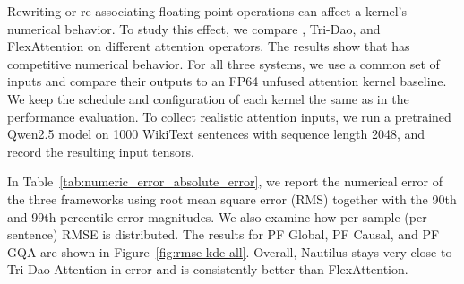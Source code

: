 \noindent
\begin{minipage}[t]{0.46\textwidth}
\vspace{0pt}
Rewriting or re-associating floating-point operations can affect a kernel's numerical
behavior. To study this effect, we compare \NAME{}, Tri-Dao, and FlexAttention on
different attention operators. The results show that \NAME{} has competitive numerical
behavior. For all three systems, we use a common set of inputs and compare their outputs
to an FP64 unfused attention kernel baseline.
We keep the schedule and configuration of each kernel the same as in the performance
evaluation. To collect realistic attention inputs, we run a pretrained Qwen2.5 model
on 1000 WikiText sentences with sequence length 2048, and record the resulting input tensors.

In Table~\ref{tab:numeric_error_absolute_error}, we report the numerical error of the
three frameworks using root mean square error (RMS) together with the 90th and 99th
percentile error magnitudes. We also examine how per-sample (per-sentence) RMSE is
distributed. The results for PF Global, PF Causal, and PF GQA are shown in
Figure~\ref{fig:rmse-kde-all}. Overall, Nautilus stays very close to Tri-Dao
Attention in error and is consistently better than FlexAttention.
\end{minipage}%
\hfill
